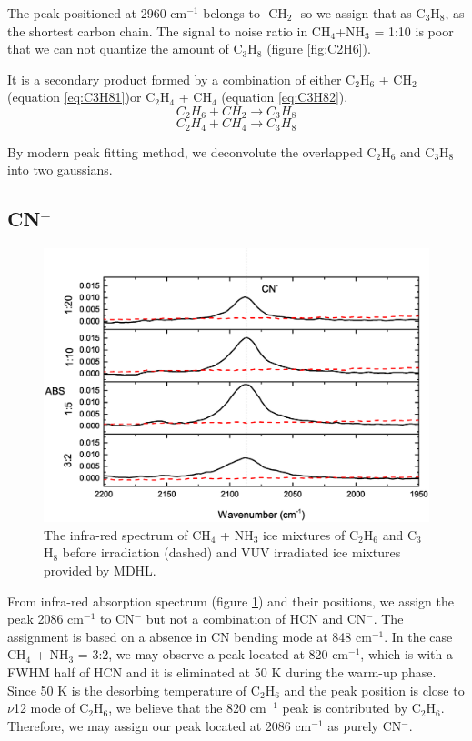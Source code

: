 The peak positioned at 2960 cm$^{-1}$ belongs to -CH$_2$- so we assign that as C$_3$H$_8$, as the shortest carbon chain. The signal to noise ratio in CH$_4$+NH$_3$ = 1:10 is poor that we can not quantize the amount of C$_3$H$_8$ (figure \ref{fig:C2H6}).

It is a secondary product formed by a combination of either C$_2$H$_6$ + CH$_2$ (equation \ref{eq:C3H81})or C$_2$H$_4$ + CH$_4$ (equation \ref{eq:C3H82}).
\begin{equation}
C_2H_6 + CH_2 \rightarrow C_3H_8
\label{eq:C3H81}
\end{equation}
\begin{equation}
C_2H_4 + CH_4 \rightarrow C_3H_8
\label{eq:C3H82}
\end{equation}

By modern peak fitting method, we deconvolute the overlapped C$_2$H$_6$ and C$_3$H$_8$ into two gaussians.

\subsection{CN$^-$}

\begin{figure}
\centering
\includegraphics[width=\textwidth]{figures/chapter3/CN.eps}
\caption{The infra-red spectrum of CH$_4$ + NH$_3$ ice mixtures of C$_2$H$_6$ and C$_3$H$_8$ before irradiation (dashed) and VUV irradiated ice mixtures provided by MDHL. }
\label{fig:CN}
\end{figure}

From infra-red absorption spectrum (figure \ref{fig:CN}) and their positions, we assign the peak 2086 cm$^{-1}$ to CN$^-$  but not a combination of HCN and CN$^-$. The assignment is based on a absence in CN bending mode at 848 cm$^{-1}$. In the case CH$_4$ + NH$_3$ = 3:2, we may observe a peak located at 820 cm$^{-1}$, which is with a FWHM half of HCN and it is eliminated at 50 K during the warm-up phase. Since 50 K is the desorbing temperature of C$_2$H$_6$ and the peak position is close to $\nu$12 mode of C$_2$H$_6$, we believe that the 820 cm$^{-1}$ peak is contributed by C$_2$H$_6$. Therefore, we may assign our peak located at 2086 cm$^{-1}$ as purely CN$^-$.\\

